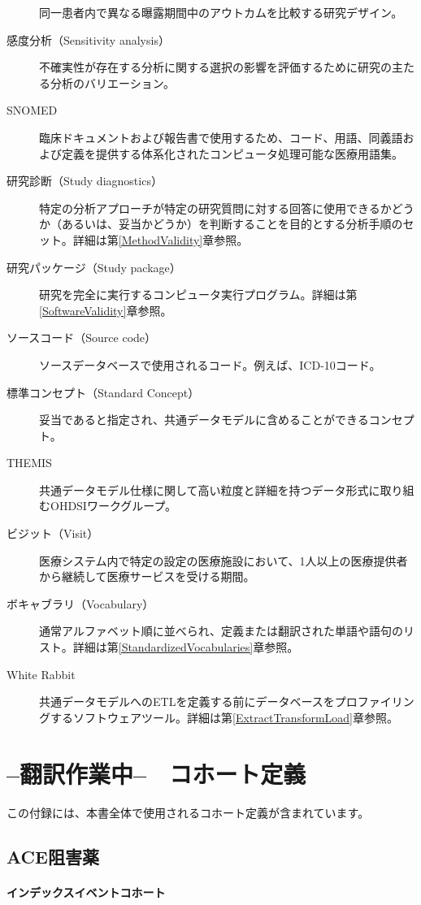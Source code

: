 \documentclass[
  11pt]{book}
\theoremstyle{definition}
\theoremstyle{definition}
\theoremstyle{definition}
\theoremstyle{definition}
\theoremstyle{remark}
\begin{document}
\begin{description}
同一患者内で異なる曝露期間中のアウトカムを比較する研究デザイン。
\item[感度分析（Sensitivity analysis）]
不確実性が存在する分析に関する選択の影響を評価するために研究の主たる分析のバリエーション。
\item[SNOMED]
臨床ドキュメントおよび報告書で使用するため、コード、用語、同義語および定義を提供する体系化されたコンピュータ処理可能な医療用語集。
\item[研究診断（Study diagnostics）]
特定の分析アプローチが特定の研究質問に対する回答に使用できるかどうか（あるいは、妥当かどうか）を判断することを目的とする分析手順のセット。詳細は第\ref{MethodValidity}章参照。
\item[研究パッケージ（Study package）]
研究を完全に実行するコンピュータ実行プログラム。詳細は第\ref{SoftwareValidity}章参照。
\item[ソースコード（Source code）]
ソースデータベースで使用されるコード。例えば、ICD-10コード。
\item[標準コンセプト（Standard Concept）]
妥当であると指定され、共通データモデルに含めることができるコンセプト。
\item[THEMIS]
共通データモデル仕様に関して高い粒度と詳細を持つデータ形式に取り組むOHDSIワークグループ。
\item[ビジット（Visit）]
医療システム内で特定の設定の医療施設において、1人以上の医療提供者から継続して医療サービスを受ける期間。
\item[ボキャブラリ（Vocabulary）]
通常アルファベット順に並べられ、定義または翻訳された単語や語句のリスト。詳細は第\ref{StandardizedVocabularies}章参照。
\item[White Rabbit]
共通データモデルへのETLを定義する前にデータベースをプロファイリングするソフトウェアツール。詳細は第\ref{ExtractTransformLoad}章参照。
\end{description}

\chapter{--翻訳作業中--　コホート定義}\label{CohortDefinitions}

この付録には、本書全体で使用されるコホート定義が含まれています。

\section{ACE阻害薬}\label{AceInhibitors}

\subsubsection*{インデックスイベントコホート}\label{ux30a4ux30f3ux30c7ux30c3ux30afux30b9ux30a4ux30d9ux30f3ux30c8ux30b3ux30dbux30fcux30c8}
\end{document}

